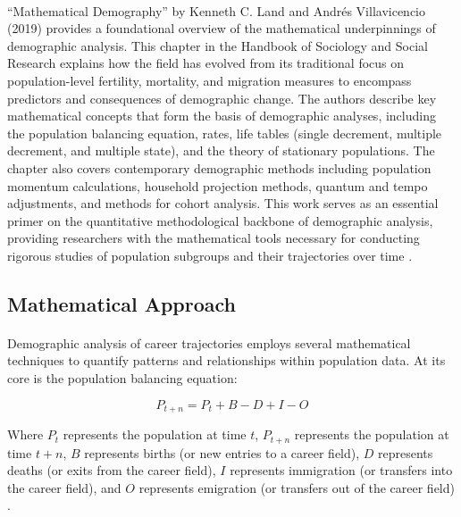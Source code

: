 \documentclass[../main.tex]{subfiles}
\begin{document}
\paragraph{} ``Mathematical Demography'' by Kenneth C. Land and Andrés Villavicencio (2019) provides a foundational overview of the mathematical underpinnings of demographic analysis. This chapter in the Handbook of Sociology and Social Research explains how the field has evolved from its traditional focus on population-level fertility, mortality, and migration measures to encompass predictors and consequences of demographic change. The authors describe key mathematical concepts that form the basis of demographic analyses, including the population balancing equation, rates, life tables (single decrement, multiple decrement, and multiple state), and the theory of stationary populations. The chapter also covers contemporary demographic methods including population momentum calculations, household projection methods, quantum and tempo adjustments, and methods for cohort analysis. This work serves as an essential primer on the quantitative methodological backbone of demographic analysis, providing researchers with the mathematical tools necessary for conducting rigorous studies of population subgroups and their trajectories over time \citep{land2019mathematical}.

\subsection{Mathematical Approach}

\paragraph{} Demographic analysis of career trajectories employs several mathematical techniques to quantify patterns and relationships within population data. At its core is the population balancing equation:

\begin{equation}
P_{t+n} = P_t + B - D + I - O
\end{equation}

Where $P_t$ represents the population at time $t$, $P_{t+n}$ represents the population at time $t+n$, $B$ represents births (or new entries to a career field), $D$ represents deaths (or exits from the career field), $I$ represents immigration (or transfers into the career field), and $O$ represents emigration (or transfers out of the career field) \citep{land2019mathematical, vanwissen2016dissertation}.
\end{document}
